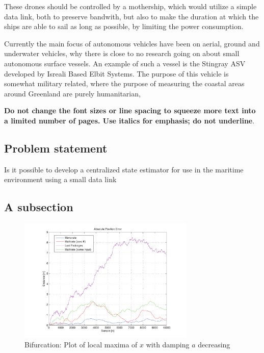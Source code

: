 \documentclass{ifacconf}
\begin{document}
These drones should be controlled by a mothership, which would utilize a simple data link, both to preserve bandwith, but also to make the duration at which the ships are able to sail as long as possible, by limiting the power consumption. 

Currently the main focus of autonomous vehicles have been on aerial, ground and underwater vehicles, why there is close to no research going on about small autonomous surface vessels. An example of such a vessel is the Stingray ASV developed by Isreali Based Elbit Systems. The purpose of this vehicle is somewhat military related, where the purpose of measuring the coastal areas around Greenland are purely humanitarian,

{\bf Do not change the font sizes or line spacing to squeeze more text into a limited number of pages. Use italics for emphasis; do not underline}.

\subsection{Problem statement}
\begin{hypo} Is it possible to develop a centralized state estimator for use in the maritime environment using a small data link \end{hypo}

\subsection{A subsection}

\begin{figure}
	\begin{center}
		\includegraphics[width=8.4cm]{img/10percent} %
		\caption{Bifurcation: Plot of local maxima of $x$ with damping $a$ decreasing}  
		\label{fig:fig1}
	\end{center}
\end{figure}
\end{document}
